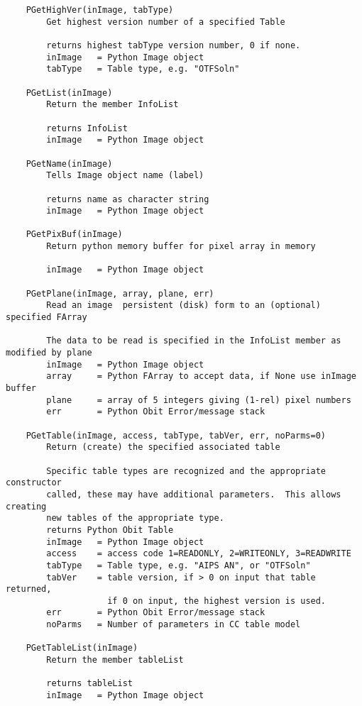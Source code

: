 \documentclass[11pt]{report}
\begin{document}
\begin{verbatim}
    PGetHighVer(inImage, tabType)
        Get highest version number of a specified Table
        
        returns highest tabType version number, 0 if none.
        inImage   = Python Image object
        tabType   = Table type, e.g. "OTFSoln"
    
    PGetList(inImage)
        Return the member InfoList
        
        returns InfoList
        inImage   = Python Image object
    
    PGetName(inImage)
        Tells Image object name (label)
        
        returns name as character string
        inImage   = Python Image object
    
    PGetPixBuf(inImage)
        Return python memory buffer for pixel array in memory
        
        inImage   = Python Image object
    
    PGetPlane(inImage, array, plane, err)
        Read an image  persistent (disk) form to an (optional) specified FArray
        
        The data to be read is specified in the InfoList member as modified by plane
        inImage   = Python Image object
        array     = Python FArray to accept data, if None use inImage buffer
        plane     = array of 5 integers giving (1-rel) pixel numbers
        err       = Python Obit Error/message stack
    
    PGetTable(inImage, access, tabType, tabVer, err, noParms=0)
        Return (create) the specified associated table
        
        Specific table types are recognized and the appropriate constructor
        called, these may have additional parameters.  This allows creating
        new tables of the appropriate type.
        returns Python Obit Table
        inImage   = Python Image object
        access    = access code 1=READONLY, 2=WRITEONLY, 3=READWRITE
        tabType   = Table type, e.g. "AIPS AN", or "OTFSoln"
        tabVer    = table version, if > 0 on input that table returned,
                    if 0 on input, the highest version is used.
        err       = Python Obit Error/message stack
        noParms   = Number of parameters in CC table model
    
    PGetTableList(inImage)
        Return the member tableList
        
        returns tableList
        inImage   = Python Image object
    

\end{verbatim}
\end{document}
